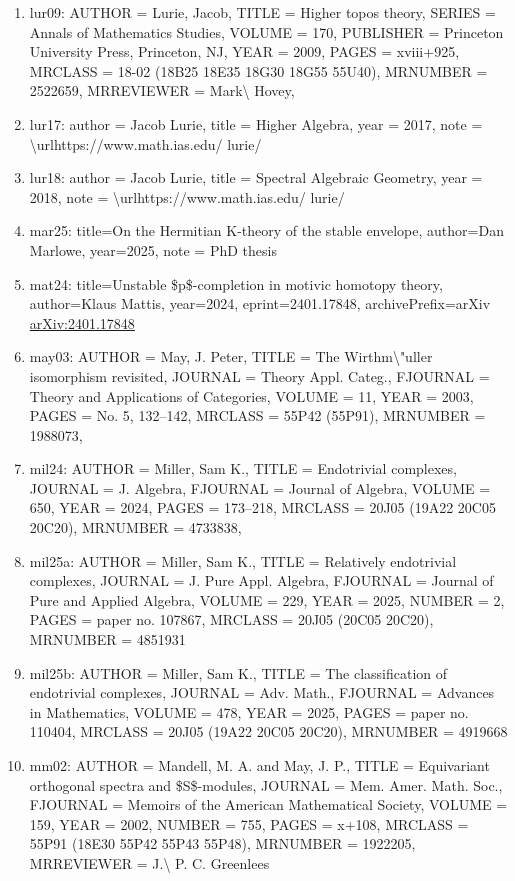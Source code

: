 \documentclass[11pt]{article}
\begin{document}
\begin{enumerate}[leftmargin=*]
  \item lur09: AUTHOR = Lurie, Jacob, TITLE = Higher topos theory, SERIES = Annals of Mathematics Studies, VOLUME = 170, PUBLISHER = Princeton University Press, Princeton, NJ, YEAR = 2009, PAGES = xviii+925, MRCLASS = 18-02 (18B25 18E35 18G30 18G55 55U40), MRNUMBER = 2522659, MRREVIEWER = Mark\textbackslash{} Hovey,
  \item lur17: author = Jacob Lurie, title = Higher Algebra, year = 2017, note = \textbackslash{}urlhttps://www.math.ias.edu/ lurie/
  \item lur18: author = Jacob Lurie, title = Spectral Algebraic Geometry, year = 2018, note = \textbackslash{}urlhttps://www.math.ias.edu/ lurie/
  \item mar25: title=On the Hermitian K-theory of the stable envelope, author=Dan Marlowe, year=2025, note = PhD thesis
  \item mat24: title=Unstable \$p\$-completion in motivic homotopy theory, author=Klaus Mattis, year=2024, eprint=2401.17848, archivePrefix=arXiv \href{https://arxiv.org/abs/2401.17848}{arXiv:2401.17848}
  \item may03: AUTHOR = May, J. Peter, TITLE = The Wirthm\textbackslash{}"uller isomorphism revisited, JOURNAL = Theory Appl. Categ., FJOURNAL = Theory and Applications of Categories, VOLUME = 11, YEAR = 2003, PAGES = No. 5, 132--142, MRCLASS = 55P42 (55P91), MRNUMBER = 1988073,
  \item mil24: AUTHOR = Miller, Sam K., TITLE = Endotrivial complexes, JOURNAL = J. Algebra, FJOURNAL = Journal of Algebra, VOLUME = 650, YEAR = 2024, PAGES = 173--218, MRCLASS = 20J05 (19A22 20C05 20C20), MRNUMBER = 4733838,
  \item mil25a: AUTHOR = Miller, Sam K., TITLE = Relatively endotrivial complexes, JOURNAL = J. Pure Appl. Algebra, FJOURNAL = Journal of Pure and Applied Algebra, VOLUME = 229, YEAR = 2025, NUMBER = 2, PAGES = paper no. 107867, MRCLASS = 20J05 (20C05 20C20), MRNUMBER = 4851931
  \item mil25b: AUTHOR = Miller, Sam K., TITLE = The classification of endotrivial complexes, JOURNAL = Adv. Math., FJOURNAL = Advances in Mathematics, VOLUME = 478, YEAR = 2025, PAGES = paper no. 110404, MRCLASS = 20J05 (19A22 20C05 20C20), MRNUMBER = 4919668
  \item mm02: AUTHOR = Mandell, M. A. and May, J. P., TITLE = Equivariant orthogonal spectra and \$S\$-modules, JOURNAL = Mem. Amer. Math. Soc., FJOURNAL = Memoirs of the American Mathematical Society, VOLUME = 159, YEAR = 2002, NUMBER = 755, PAGES = x+108, MRCLASS = 55P91 (18E30 55P42 55P43 55P48), MRNUMBER = 1922205, MRREVIEWER = J.\textbackslash{} P. C. Greenlees

\end{enumerate}
\end{document}
